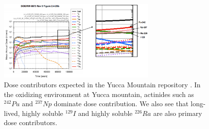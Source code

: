 \begin{figure}[htbp!]
  \begin{center}
    \includegraphics[width=0.7\textwidth]{./images/swift_dose_yucca.eps}
  \end{center}
  \caption{Dose contributors expected in the Yucca Mountain repository 
    \cite{swift_applying_2010}. In the oxidizing environment at Yucca mountain, 
    actinides such as $^{242}Pu$ and $^{237}Np$ dominate dose contribution. We 
    also see that long-lived, highly soluble $^{129}I$ and highly soluble 
    $^{226}Ra$ are also primary dose contributors.}
  \label{fig:swift_dose_yucca}
\end{figure}
